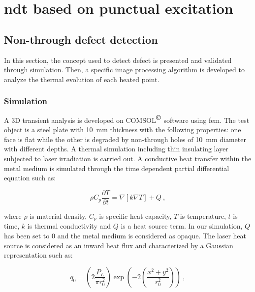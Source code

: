 \graphicspath{ {./content/simu/figure/} }

\section{\acl{ndt} based on punctual excitation}\label{sec:3}

\subsection{Non-through defect detection}\label{subsec:31}

In this section, the concept used to detect defect is presented and validated through simulation. Then, a specific image processing algorithm is developed to analyze the thermal evolution of each heated point. 

\subsubsection{Simulation}\label{subsec:311}

A 3D transient analysis is developed on COMSOL\textsuperscript{$\copyright$} software using \ac{fem}. The test object is a steel plate with \SI{10}{\milli \metre} thickness with the following properties: one face is flat while the other is degraded by non-through holes of \SI{10}{\milli \metre} diameter with different depths. A thermal simulation including thin insulating layer subjected to laser irradiation is carried out. 
A conductive heat transfer within the metal medium is simulated through the time dependent partial differential equation such as:

\begin{equation}
  \label{eq:1}
  \rho C_p \frac{\partial T}{\partial t} = \nabla \left[ k \nabla T  \right] + Q \ ,
\end{equation}

\noindent where $\rho$ is material density, $C_p$ is specific heat capacity, $T$ is temperature, $t$ is time, $k$ is thermal conductivity and $Q$ is a heat source term.
In our simulation, $Q$ has been set to $0$ and the metal medium is considered as opaque. The laser heat source is considered as an inward heat flux and characterized by a Gaussian representation such as:

\begin{equation}
  \label{eq:2}
  q_0 = \left( 2 \frac{P_L}{\pi r_{0}^{2}} \right) \exp \left( -2 \left( \frac{x^2 + y^2}{r_{0}^{2}} \right) \right) \ ,
\end{equation}

